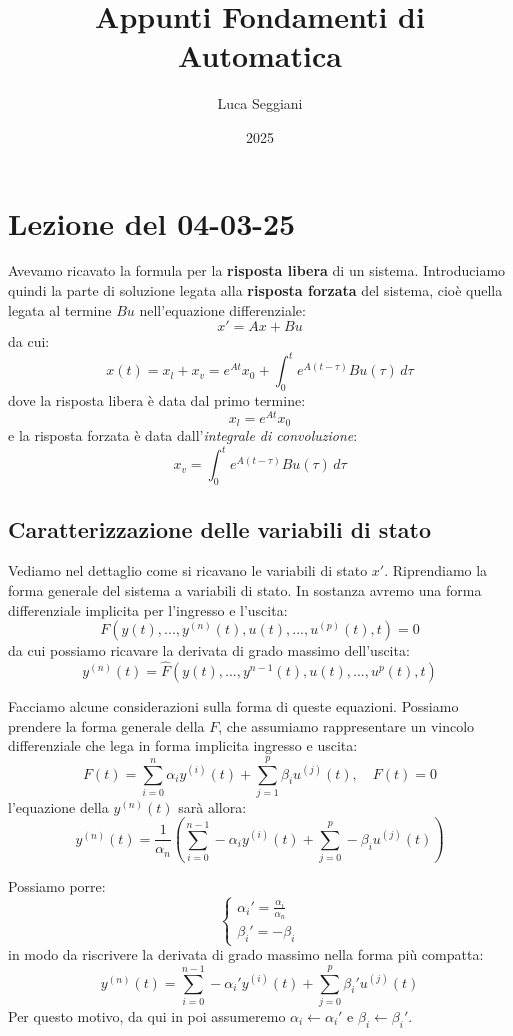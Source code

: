 \documentclass[a4paper,11pt]{article}
\title{Appunti Fondamenti di Automatica}
\author{Luca Seggiani}
\date{2025}
\begin{document}
\section{Lezione del 04-03-25}

\thispagestyle{empty}
\pagestyle{fancy}

Avevamo ricavato la formula per la \textbf{risposta libera} di un sistema.
Introduciamo quindi la parte di soluzione legata alla \textbf{risposta forzata} del sistema, cioè quella legata al termine $Bu$ nell'equazione differenziale:
$$
x' = Ax + Bu
$$
da cui:
$$
x(t) = x_l + x_v = e^{At} x_0 + \int_0^t e^{A(t - \tau)} Bu(\tau) \, d\tau
$$
dove la risposta libera è data dal primo termine:
$$
x_l = e^{At} x_0 
$$
e la risposta forzata è data dall'\textit{integrale di convoluzione}:
$$
x_v = \int_0^t e^{A(t - \tau)} Bu(\tau) \, d\tau
$$

\subsection{Caratterizzazione delle variabili di stato}
Vediamo nel dettaglio come si ricavano le variabili di stato $x'$.
Riprendiamo la forma generale del sistema a variabili di stato.
In sostanza avremo una forma differenziale implicita per l'ingresso e l'uscita: 
$$
F \left( y(t), ..., y^{(n)}(t), u(t), ..., u^{(p)}(t), t \right) = 0
$$
da cui possiamo ricavare la derivata di grado massimo dell'uscita: 
$$
y^{(n)}(t) = \hat{F} \left( y(t), ..., y^{n-1}(t), u(t), ..., u^p(t), t \right)
$$

\par\smallskip

Facciamo alcune considerazioni sulla forma di queste equazioni.
Possiamo prendere la forma generale della $F$, che assumiamo rappresentare  un vincolo differenziale che lega in forma implicita ingresso e uscita:
$$
F(t) = \sum_{i = 0}^{n} \alpha_i y^{(i)} (t) + \sum_{j = 1}^{p} \beta_i u^{(j)} (t), \quad F(t) = 0
$$
l'equazione della $y^{(n)} (t)$ sarà allora:
$$
y^{(n)} (t) = \frac{1}{\alpha_n} \left( \sum_{i = 0}^{n - 1} - \alpha_i y^{(i)} (t) + \sum_{j = 0}^p - \beta_i u^{(j)} (t) \right)
$$

Possiamo porre:
\[
	\begin{cases}		
		\alpha_i ' = \frac{\alpha_i}{\alpha_n} \\ 
		\beta_i ' = - \beta_i
	\end{cases}
\]
in modo da riscrivere la derivata di grado massimo nella forma più compatta:
$$
y^{(n)} (t) = \sum_{i = 0}^{n - 1} - \alpha_i ' y^{(i)} (t) + \sum_{j = 0}^p  \beta_i ' u^{(j)} (t) 
$$
Per questo motivo, da qui in poi assumeremo $\alpha_i \leftarrow \alpha_i '$ e $\beta_i \leftarrow \beta_i '$.
\end{document}
